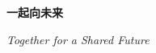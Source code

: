 \documentclass{ctexart}
\begin{document}
    {\bfseries\Large 一起向未来\par}
    {\itshape Together for a Shared Future}
\end{document}
